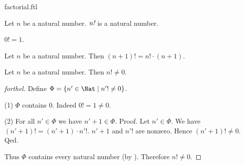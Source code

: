 \documentclass{naproche-library}
\begin{document}
\begin{smodule}[title=Factorial]{factorial.ftl}

\begin{signature}[forthel,id=ARITHMETIC_12_0210357812531785]
  Let $n$ be a natural number.
  $\emph{n!}$ is a natural number.
\end{signature}

\begin{axiom}[forthel,id=ARITHMETIC_12_6945210541236989]
  $0! = 1$.
\end{axiom}

\begin{axiom}[forthel,id=ARITHMETIC_12_2312015846987452]
  Let $n$ be a natural number.
  Then $(n + 1)! = n! \cdot (n + 1)$.
\end{axiom}

\begin{proposition}[forthel,id=ARITHMETIC_12_6123519005949952]
  Let $n$ be a natural number.
  Then $n! \neq 0$.
\end{proposition}
\begin{proof}[forthel]
  Define $\Phi = \{n' \in \Nat \mid n'! \neq 0 \}$.

  (1) $\Phi$ contains $0$.
  Indeed $0! = 1 \neq 0$.

  (2) For all $n' \in \Phi$ we have $n' + 1 \in \Phi$. \newline
  Proof.
    Let $n' \in \Phi$.
    We have $(n' + 1)! = (n' + 1) \cdot n'!$.
    $n' + 1$ and $n'!$ are nonzero.
    Hence $(n' + 1)! \neq 0$.
  Qed.

  Thus $\Phi$ contains every natural number (by ).
  Therefore $n! \neq 0$.
\end{proof}
\end{smodule}
\end{document}
